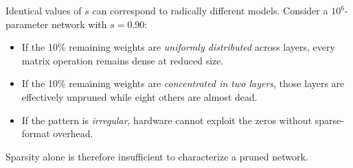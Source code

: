 \medskip
Identical values of $s$ can correspond to radically different models.
Consider a $10^6$-parameter network with $s = 0.90$:

\begin{itemize}[nosep]
	\item If the 10\% remaining weights are \emph{uniformly distributed} across
	layers, every matrix operation remains dense at reduced size.
	\item If the 10\% remaining weights are \emph{concentrated in two layers},
	those layers are effectively unpruned while eight others are almost
	dead.
	\item If the pattern is \emph{irregular}, hardware cannot exploit the zeros
	without sparse-format overhead.
\end{itemize}

Sparsity alone is therefore insufficient to characterize a pruned network.
%
%
%
%
